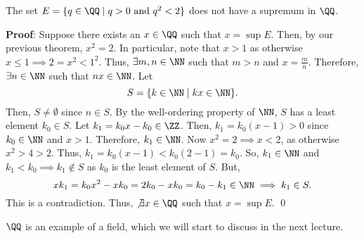 \begin{theorem}
The set $E = \{q\in \QQ\mid q>0 \text{~and~} q^2<2\}$ does not have a supremum in $\QQ$.
\end{theorem}
\textbf{Proof}: Suppose there exists an $x\in \QQ$ such that $x=\sup E$. Then, by our previous theorem, $x^2 = 2$. In particular, note that $x>1$ as otherwise $x\leq 1 \implies 2=x^2 <1^2$. Thus, $\exists m,n\in \NN$ such that $m>n$ and $x=\frac{m}{n}$. Therefore, $\exists n\in \NN$ such that $nx \in \NN$. Let  
\[
S = \{k\in \NN\mid kx\in \NN\}.
\]
Then, $S\neq \emptyset$ since $n\in S$. By the well-ordering property of $\NN$, $S$ has a least element $k_0 \in S$. Let $k_1 = k_0x-k_0 \in \ZZ$. Then, $k_1 = k_0(x-1) >0$ since $k_0 \in \NN$ and $x>1.$ Therefore, $k_1 \in \NN$. Now $x^2 = 2 \implies x<2$, as otherwise $x^2>4>2$. Thus, $k_1 = k_0(x-1)<k_0(2-1) = k_0$. So, $k_1\in \NN$ and $k_1 <k_0 \implies k_1 \notin S$ as $k_0$ is the least element of $S$. But, 
\[
xk_1 = k_0x^2 -xk_0 = 2k_0-xk_0 = k_0-k_1 \in \NN\implies k_1 \in S.
\]
This is a contradiction. Thus, $\not\exists x\in \QQ$ such that $x = \sup E$.  \qed 

$\QQ$ is an example of a field, which we will start to discuss in the next lecture.